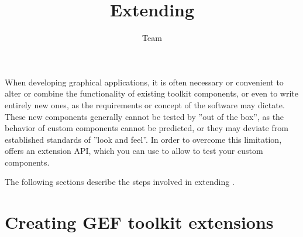 
%
\title{Extending \app{}}
\author*{\app{} Team}{}
\maketitle

\setcounter{tocdepth}{2}
\tableofcontents
\renewcommand{\bxcomment}[2]{}%
\clearpage

\setcounter{secnumdepth}{2}

When developing graphical applications, it is often necessary or
convenient to alter or combine the functionality of existing toolkit
components, or even to write entirely new ones, as the requirements or
concept of the software may dictate. These new components
generally cannot be tested by \app{} ''out of the box'', as the
behavior of custom components cannot be predicted, or they may deviate
from established standards of ''look and feel''. In order to overcome this limitation, \app{} offers an extension
API, which you can use to allow \app{} to test your custom components.

The following sections describe the steps involved in extending
\app{}.

\clearpage



\clearpage

\chapter{Creating GEF toolkit extensions}


\clearpage



